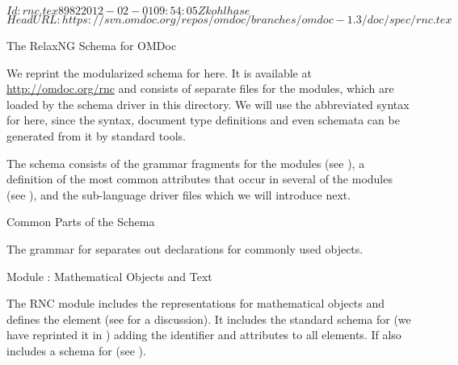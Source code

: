 \svnInfo $Id: rnc.tex 8982 2012-02-01 09:54:05Z kohlhase $
\svnKeyword $HeadURL: https://svn.omdoc.org/repos/omdoc/branches/omdoc-1.3/doc/spec/rnc.tex $

\begin{tchapter}[id=rnc]{The RelaxNG Schema for OMDoc}

We reprint the modularized {\relaxng} schema for {\omdoc} here. It is available at
\url{http://omdoc.org/rnc} and consists of separate files for the {\omdoc}
modules, which are loaded by the schema driver {} in this directory. We
will use the abbreviated syntax for {\relaxng} here, since the {\xml} syntax, document
type definitions and even {\xml} schemata can be generated
from it by standard tools.

The {\relaxng} schema consists of the grammar fragments for the modules (see
{}), a definition of the most common attributes that
occur in several of the modules (see {}), and the sub-language
driver files which we will introduce next.

\begin{tsection}[id=rnc:attributes]{Common Parts of the Schema}
  
  The {\relaxng} grammar for {\omdoc} separates out declarations for commonly used
  objects.


  
\end{tsection}

\begin{tsection}[id=rnc:math]{Module {}: Mathematical Objects and Text}
  
  The RNC module {} includes the representations for mathematical objects
  and defines the {} element (see {} for a discussion). It
  includes the standard {\relaxng} schema for {\openmath} (we have reprinted it in
  {}) adding the {\omdoc} identifier and {\css}
  attributes to all elements. If also includes a schema for {\mathml}
  (see {}).


\end{tsection}
\end{tchapter}
